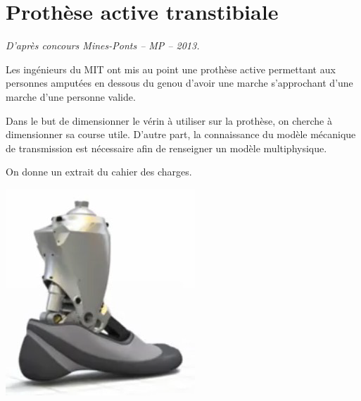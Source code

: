 \documentclass[10pt]{article}
\begin{document}






\section*{Prothèse active transtibiale}

\begin{flushright}
\textit{D'après concours Mines-Ponts -- MP -- 2013.}
\end{flushright}
\begin{minipage}[c]{.8\linewidth}
Les ingénieurs du MIT ont mis au point une prothèse active permettant aux personnes amputées en dessous du genou d'avoir une marche s'approchant d'une marche d'une personne valide. 
\begin{obj} 
Dans le but de dimensionner le vérin à utiliser sur la prothèse, on cherche à dimensionner sa course utile. D'autre part, la connaissance du modèle mécanique de transmission est nécessaire afin de renseigner un modèle multiphysique. 
\end{obj}

 On donne un extrait du cahier des charges.
 
\end{minipage} \hfill
\begin{minipage}[c]{.15\linewidth}
\begin{center}
\includegraphics[width=\textwidth]{images/prot_01}
\end{center}
\end{minipage}
\end{document}
